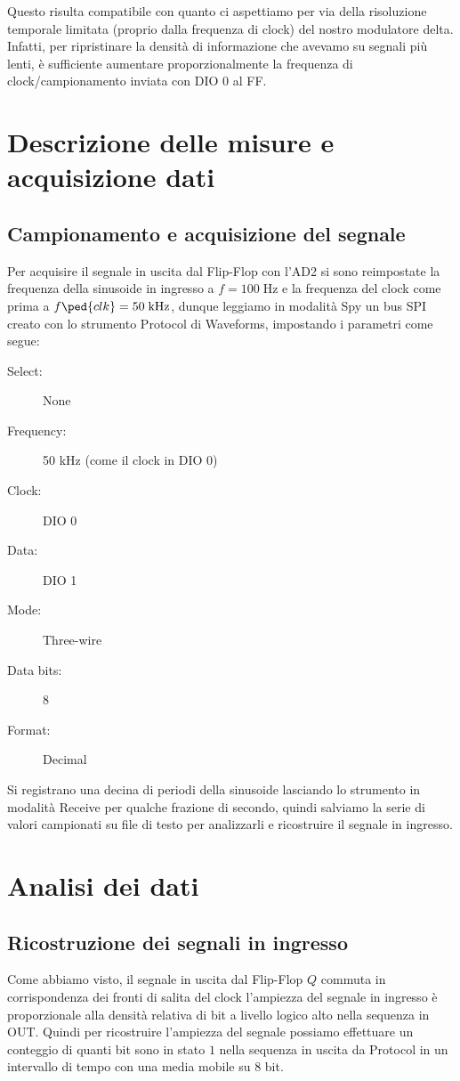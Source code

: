 \documentclass[10pt, a4paper, italian]{article}
\begin{document}
Questo risulta compatibile con quanto ci aspettiamo per via della risoluzione
temporale limitata (proprio dalla frequenza di clock) del nostro modulatore
delta. Infatti, per ripristinare la densità di informazione che avevamo su
segnali più lenti, è sufficiente aumentare proporzionalmente la frequenza
di clock/campionamento inviata con DIO 0 al FF.

\section{Descrizione delle misure e acquisizione dati}
\subsection{Campionamento e acquisizione del segnale}
Per acquisire il segnale in uscita dal Flip-Flop con l'AD2 si sono reimpostate
la frequenza della sinusoide in ingresso a $f = 100 \; \si{\Hz}$ e la
frequenza del clock come prima a $f\ped{clk} = 50 \; \si{k\Hz}$, dunque
leggiamo in modalità Spy un bus SPI creato con lo strumento Protocol di
Waveforms, impostando i parametri come segue:
\begin{description}
\item[Select:] None
\item[Frequency:] 50 kHz (come il clock in DIO 0)
\item[Clock:] DIO 0
\item[Data:] DIO 1
\item[Mode:] Three-wire
\item[Data bits:] 8
\item[Format:] Decimal
\end{description}

Si registrano una decina di periodi della sinusoide lasciando lo strumento in
modalità Receive per qualche frazione di secondo, quindi salviamo la serie
di valori campionati su file di testo per analizzarli e ricostruire il segnale
in ingresso.

\section{Analisi dei dati}
\subsection{Ricostruzione dei segnali in ingresso}
Come abbiamo visto, il segnale in uscita dal Flip-Flop $Q$ commuta in
corrispondenza dei fronti di salita del clock l'ampiezza del segnale in
ingresso è proporzionale alla densità relativa di bit a livello logico alto
nella sequenza in OUT. Quindi per ricostruire l'ampiezza del segnale possiamo
effettuare un conteggio di quanti bit sono in stato $1$ nella sequenza in
uscita da Protocol in un intervallo di tempo con una media mobile su $8$ bit.
\end{document}
